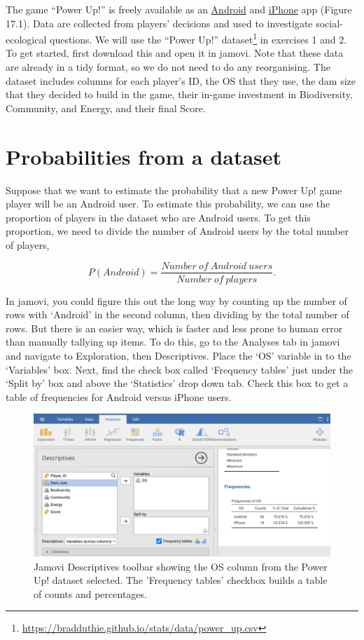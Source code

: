 \documentclass[
]{scrbook}
\begin{document}
The game ``Power Up!'' is freely available as an \href{https://play.google.com/store/apps/details?id=com.hyperluminal.stirlinguniversity.sustainabledevelopmentgame}{Android} and \href{https://apps.apple.com/gb/app/power-up/id1585634888}{iPhone} app (Figure 17.1).
Data are collected from players' decisions and used to investigate social-ecological questions.
We will use the ``Power Up!'' dataset\footnote{\url{https://bradduthie.github.io/stats/data/power_up.csv}} in exercises 1 and 2.
To get started, first download this and open it in jamovi.
Note that these data are already in a tidy format, so we do not need to do any reorganising.
The dataset includes columns for each player's ID, the OS that they use, the dam size that they decided to build in the game, their in-game investment in Biodiversity, Community, and Energy, and their final Score.

\hypertarget{probabilities-from-a-dataset}{%
\section{Probabilities from a dataset}\label{probabilities-from-a-dataset}}

Suppose that we want to estimate the probability that a new Power Up! game player will be an Android user.
To estimate this probability, we can use the proportion of players in the dataset who are Android users.
To get this proportion, we need to divide the number of Android users by the total number of players,

\[P(Android) = \frac{Number\:of\:Android\:users}{Number\:of\:players}.\]

In jamovi, you could figure this out the long way by counting up the number of rows with `Android' in the second column, then dividing by the total number of rows.
But there is an easier way, which is faster and less prone to human error than manually tallying up items.
To do this, go to the Analyses tab in jamovi and navigate to Exploration, then Descriptives.
Place the `OS' variable in to the `Variables' box.
Next, find the check box called `Frequency tables' just under the `Split by' box and above the `Statistics' drop down tab.
Check this box to get a table of frequencies for Android versus iPhone users.

\begin{figure}
\includegraphics[width=1\linewidth]{img/jamovi_power_up_frequencies} \caption{Jamovi Descriptives toolbar showing the OS column from the Power Up! dataset selected. The 'Frequency tables' checkbox builds a table of counts and percentages.}\label{fig:unnamed-chunk-72}
\end{figure}
\end{document}

